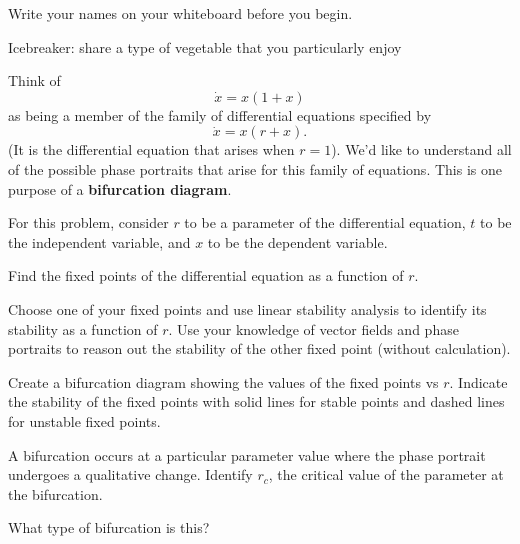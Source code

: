 \documentclass[12pt,letterpaper,noanswers]{exam}
\begin{document}
Write your names on your whiteboard before you begin.

Icebreaker: share a type of vegetable that you particularly enjoy


\begin{questions}


\item




Think of \[\dot{x} = x(1+x)\] as being a member of the family of differential 
equations specified by \[\dot{x} = x(r+x).\]  (It is the differential equation that arises when $r=1$).  We'd like to understand all of the possible phase portraits that arise for this family of equations.  This is one purpose of a \textbf{bifurcation diagram}.  

For this problem, consider $r$ to be a parameter of the differential equation, $t$ to be the independent variable, and $x$ to be the dependent variable.

\begin{parts}
\item Find the fixed points of the differential equation as a function of $r$.  
\item Choose one of your fixed points and use linear stability analysis to identify its stability as a function of $r$.  Use your knowledge of vector fields and phase portraits to reason out the stability of the other fixed point (without calculation).
\item Create a bifurcation diagram showing the values of the fixed points vs $r$.  Indicate the stability of the fixed points with solid lines for stable points and dashed lines for unstable fixed points.
\item A bifurcation occurs at a particular parameter value where the phase portrait undergoes a qualitative change.  Identify $r_c$, the critical value of the parameter at the bifurcation.
\item What type of bifurcation is this?
\end{parts}


\end{questions}
\end{document}
